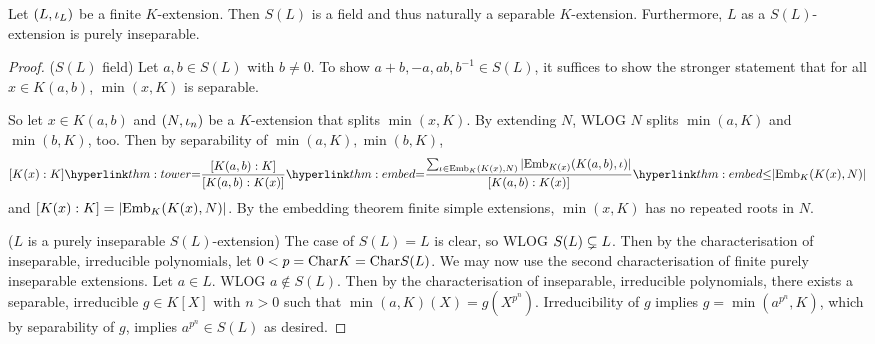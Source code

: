 \documentclass[main.tex]{subfiles}
\begin{document}
\begin{thm} 
  
  Let $(L,\iota_L)$ be a finite $K$-extension. 
  Then $S(L)$ is a field and thus naturally a separable $K$-extension. 
  Furthermore, $L$ as a $S(L)$-extension is purely inseparable. 
\end{thm}
\begin{proof}
  ($S(L)$ field) Let $a, b \in S(L)$ with $b \neq 0$. 
  To show $a + b, -a, a b, b^{-1} \in S(L)$,
  it suffices to show the stronger statement that 
  for all $x \in K(a,b)$, $\min(x,K)$ is separable.
  
  So let $x \in K(a,b)$ and 
  $(N,\iota_n)$ be a $K$-extension that splits $\min(x,K)$. 
  By extending $N$, WLOG $N$ splits $\min(a,K)$ and $\min(b,K)$, too.
  Then by separability of $\min(a,K), \min(b,K)$, \[
    [K(x) : K]
    \linkto{thm:tower}{=} \frac{[K(a,b) : K]}{[K(a,b) : K(x)]}
    \linkto{thm:embed}{=} 
      \frac{\sum_{\io \in \emb{K}{K(x)}{N}} |\emb{K(x)}{K(a,b)}{\io}|}
      {[K(a,b) : K(x)]}
      \linkto{thm:embed}{\leq} |\emb{K}{K(x)}{N}|
  \]
  and  $[K(x) : K] = |\mathrm{Emb}_{K}(K(x), N)|$.
  By the 
  {embedding theorem finite simple extensions}, 
  $\min(x,K)$ has no repeated roots in $N$. 

  ($L$ is a purely inseparable $S(L)$-extension)
  The case of $S(L) = L$ is clear, so WLOG $S(L) \subsetneq L$.
  Then by the 
  {characterisation of inseparable, irreducible polynomials}, 
  let $0 < p = \mathrm{Char}K = \mathrm{Char}S(L)$.
  We may now use the second 
  {characterisation of finite purely inseparable extensions}. 
  Let $a \in L$. WLOG $a \notin S(L)$.
  Then by the 
  {characterisation of inseparable, irreducible polynomials}, 
  there exists a separable, irreducible $g \in K[X]$ with $n > 0$ such that 
  $\min(a,K)(X) = g(X^{p^n})$. 
  Irreducibility of $g$ implies $g = \min(a^{p^n},K)$,
  which by separability of $g$, implies $a^{p^n} \in S(L)$ as desired.
\end{proof}
\end{document}
